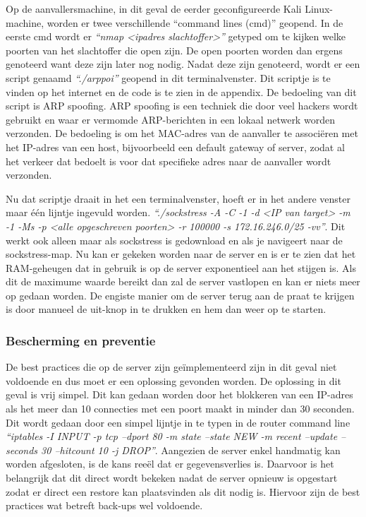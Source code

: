 \documentclass[pdftex,a4paper,12pt]{report}
\begin{document}
Op de aanvallersmachine, in dit geval de eerder geconfigureerde Kali Linux-machine, worden er twee verschillende "`command lines (cmd)"' geopend. In de eerste cmd wordt er \textit{"`nmap <ipadres slachtoffer>"'} getyped om te kijken welke poorten van het slachtoffer die open zijn. De open poorten worden dan ergens genoteerd want deze zijn later nog nodig. Nadat deze zijn genoteerd, wordt er een script genaamd \textit{"`./arppoi"'} geopend in dit terminalvenster. Dit scriptje is te vinden op het internet en de code is te zien in de appendix. De bedoeling van dit script is ARP spoofing. ARP spoofing is een techniek die door veel hackers wordt gebruikt en waar er vermomde ARP-berichten in een lokaal netwerk worden verzonden. De bedoeling is om het MAC-adres van de aanvaller te associëren met het IP-adres van een host, bijvoorbeeld een default gateway of server, zodat al het verkeer dat bedoelt is voor dat specifieke adres naar de aanvaller wordt verzonden. \newline 

Nu dat scriptje draait in het een terminalvenster, hoeft er in het andere venster maar één lijntje ingevuld worden. \textit{"`./sockstress -A -C -1 -d <IP van target> -m -1 -Ms -p <alle opgeschreven poorten> -r 100000 -s 172.16.246.0/25 -vv"'}. Dit werkt ook alleen maar als sockstress is gedownload en als je navigeert naar de sockstress-map. Nu kan er gekeken worden naar de server en is er te zien dat het RAM-geheugen dat in gebruik is op de server exponentieel aan het stijgen is. Als dit de maximume waarde bereikt dan zal de server vastlopen en kan er niets meer op gedaan worden. De engiste manier om de server terug aan de praat te krijgen is door manueel de uit-knop in te drukken en hem dan weer op te starten.

\subsubsection{Bescherming en preventie}
De best practices die op de server zijn geïmplementeerd zijn in dit geval niet voldoende en dus moet er een oplossing gevonden worden. De oplossing in dit geval is vrij simpel. Dit kan gedaan worden door het blokkeren van een IP-adres als het meer dan 10 connecties met een poort maakt in minder dan 30 seconden. Dit wordt gedaan door een simpel lijntje in te typen in de router command line \textit{"`iptables -I INPUT -p tcp --dport 80 -m state --state NEW -m recent --update --seconds 30 --hitcount 10 -j DROP"'}. Aangezien de server enkel handmatig kan worden afgesloten, is de kans reeël dat er gegevensverlies is. Daarvoor is het belangrijk dat dit direct wordt bekeken nadat de server opnieuw is opgestart zodat er direct een restore kan plaatsvinden als dit nodig is. Hiervoor zijn de best practices wat betreft back-ups wel voldoende. 
\end{document}
